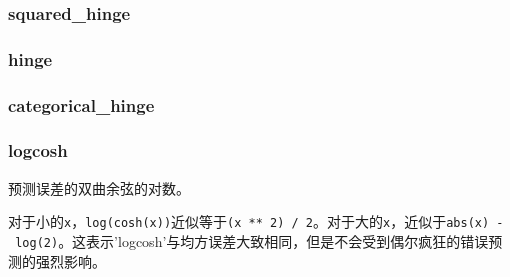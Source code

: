 \subsubsection{squared\_hinge}\label{squaredux5fhinge}

\begin{Shaded}
\begin{Highlighting}[]
\end{Highlighting}
\end{Shaded}



\subsubsection{hinge}\label{hinge}

\begin{Shaded}
\begin{Highlighting}[]
\end{Highlighting}
\end{Shaded}



\subsubsection{categorical\_hinge}\label{categoricalux5fhinge}

\begin{Shaded}
\begin{Highlighting}[]
\end{Highlighting}
\end{Shaded}



\subsubsection{logcosh}\label{logcosh}

\begin{Shaded}
\begin{Highlighting}[]
\end{Highlighting}
\end{Shaded}

预测误差的双曲余弦的对数。

对于小的\texttt{x}，\texttt{log(cosh(x))}近似等于\texttt{(x\ **\ 2)\ /\ 2}。对于大的\texttt{x}，近似于\texttt{abs(x)\ -\ log(2)}。这表示'logcosh'与均方误差大致相同，但是不会受到偶尔疯狂的错误预测的强烈影响。

